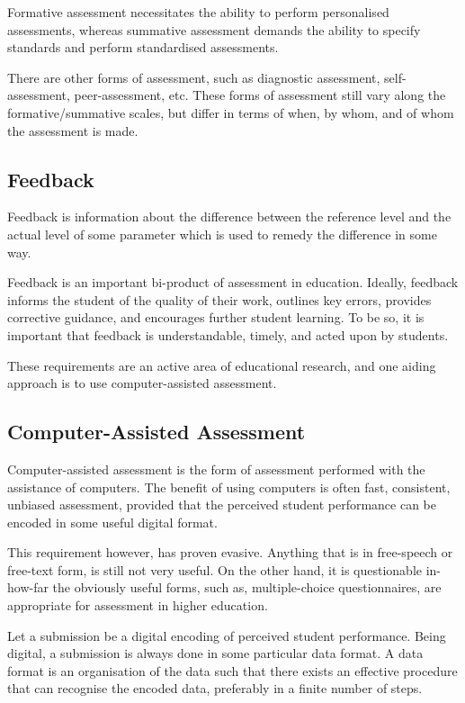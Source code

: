 Formative assessment necessitates the ability to perform personalised
assessments, whereas summative assessment demands the ability to specify
standards and perform standardised assessments.

There are other forms of assessment, such as diagnostic assessment,
self-assessment, peer-assessment, etc. These forms of assessment still vary
along the formative/summative scales, but differ in terms of when, by whom, and
of whom the assessment is made.

\subsection{Feedback}

Feedback is information about the difference between the reference level and
the actual level of some parameter which is used to remedy the difference in
some way\cite{ramaprasad1989}.

Feedback is an important bi-product of assessment in
education\cite{black-william-1998}. Ideally, feedback informs the student of
the quality of their work, outlines key errors, provides corrective guidance,
and encourages further student learning. To be so, it is important that
feedback is understandable, timely, and acted upon by
students\cite{gibbs-simpson-2004}.

These requirements are an active area of educational research, and one aiding
approach is to use computer-assisted assessment.

\subsection{Computer-Assisted Assessment}

Computer-assisted assessment is the form of assessment performed with the
assistance of computers\cite{conole-warburton-2005}. The benefit of using
computers is often fast, consistent, unbiased assessment, provided that the
perceived student performance can be encoded in some useful digital format.

This requirement however, has proven evasive. Anything that is in free-speech
or free-text form, is still not very useful\cite{valenti-et-al-2003}. On the
other hand, it is questionable in-how-far the obviously useful forms, such as,
multiple-choice questionnaires, are appropriate for assessment in higher
education\cite{conole-warburton-2005}.

Let a submission be a digital encoding of perceived student performance. Being
digital, a submission is always done in some particular data format. A data
format is an organisation of the data such that there exists an effective
procedure that can recognise the encoded data, preferably in a finite number of
steps.


